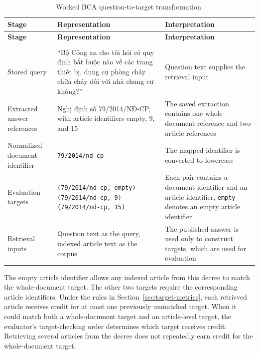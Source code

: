 \begingroup
\small
\setlength{\tabcolsep}{3pt}
\renewcommand{\arraystretch}{1.18}
\begin{longtable}{>{\raggedright\arraybackslash}p{3.429cm}>{\raggedright\arraybackslash}p{5.828cm}>{\raggedright\arraybackslash}p{6.084cm}}
\caption[Worked BCA question-to-target transformation.]{Worked BCA question-to-target transformation.}\label{tab:4.2}\\
\toprule
\textbf{Stage} & \textbf{Representation} & \textbf{Interpretation} \\
\midrule
\endfirsthead
\toprule
\textbf{Stage} & \textbf{Representation} & \textbf{Interpretation} \\
\midrule
\endhead
\midrule
\multicolumn{3}{r}{\footnotesize Continued on next page}\\
\endfoot
\bottomrule
\endlastfoot
Stored query & ``Bộ Công an cho tôi hỏi có quy định bắt buộc nào về các trang thiết bị, dụng cụ phòng cháy chữa cháy đối với nhà chung cư không?'' & Question text supplies the retrieval input \\
Extracted answer references & Nghị định số 79/2014/NĐ-CP, with article identifiers empty, 9, and 15 & The saved extraction contains one whole-document reference and two article references \\
Normalized document identifier & \texttt{79/2014/nd-cp} & The mapped identifier is converted to lowercase \\
Evaluation targets & \texttt{(79/2014/nd-cp, empty)}\newline \texttt{(79/2014/nd-cp, 9)}\newline \texttt{(79/2014/nd-cp, 15)} & Each pair contains a document identifier and an article identifier, \texttt{empty} denotes an empty article identifier \\
Retrieval inputs & Question text as the query, indexed article text as the corpus & The published answer is used only to construct targets, which are used for evaluation \\
\end{longtable}
\endgroup

The empty article identifier allows any indexed article from this decree to match the whole-document target. The other two targets require the corresponding article identifiers. Under the rules in Section~\ref{sec:target-metrics}, each retrieved article receives credit for at most one previously unmatched target. When it could match both a whole-document target and an article-level target, the evaluator's target-checking order determines which target receives credit. Retrieving several articles from the decree does not repeatedly earn credit for the whole-document target.


